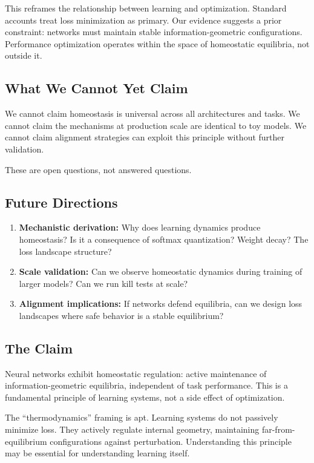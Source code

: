 This reframes the relationship between learning and optimization. Standard accounts treat loss minimization as primary. Our evidence suggests a prior constraint: networks must maintain stable information-geometric configurations. Performance optimization operates within the space of homeostatic equilibria, not outside it.

\subsection*{What We Cannot Yet Claim}

We cannot claim homeostasis is universal across all architectures and tasks. We cannot claim the mechanisms at production scale are identical to toy models. We cannot claim alignment strategies can exploit this principle without further validation.

These are open questions, not answered questions.

\subsection*{Future Directions}

\begin{enumerate}
    \item \textbf{Mechanistic derivation:} Why does learning dynamics produce homeostasis? Is it a consequence of softmax quantization? Weight decay? The loss landscape structure?
    \item \textbf{Scale validation:} Can we observe homeostatic dynamics during training of larger models? Can we run kill tests at scale?
    \item \textbf{Alignment implications:} If networks defend equilibria, can we design loss landscapes where safe behavior is a stable equilibrium?
\end{enumerate}

\subsection*{The Claim}

Neural networks exhibit homeostatic regulation: active maintenance of information-geometric equilibria, independent of task performance. This is a fundamental principle of learning systems, not a side effect of optimization.

The ``thermodynamics'' framing is apt. Learning systems do not passively minimize loss. They actively regulate internal geometry, maintaining far-from-equilibrium configurations against perturbation. Understanding this principle may be essential for understanding learning itself.
